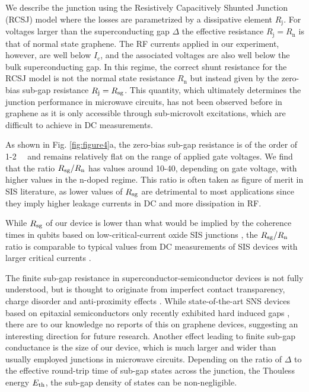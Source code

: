 We describe the junction using the Resistively Capacitively Shunted Junction (RCSJ) model where the losses are parametrized by a dissipative element $R_\textrm{j}$.
For voltages larger than the superconducting gap $\Delta$ the effective resistance $R_\textrm{j} = R_\textrm{n}$ is that of normal state graphene.
The RF currents applied in our experiment, however, are well below $I_\textrm{c}$, and the associated voltages are also well below the bulk superconducting gap.
In this regime, the correct shunt resistance for the RCSJ model is not the normal state resistance $R_\textrm{n}$ but instead given by the zero-bias sub-gap resistance $R_\textrm{j} = R_{\rm sg}$.
This quantity, which ultimately determines the junction performance in microwave circuits, has not been observed before in graphene as it is only accessible through sub-microvolt excitations, which are difficult to achieve in DC measurements.

As shown in Fig. \ref{fig:figure4}a, the zero-bias sub-gap resistance is of the order of 1-\SI{2}{\kilo\Omega} and remains relatively flat on the range of applied gate voltages.
We find that the ratio $R_{\rm sg}/R_\textrm{n}$ has values around 10-40, depending on gate voltage, with higher values in the n-doped regime.
This ratio is often taken as figure of merit in SIS literature, as lower values of $R_{\rm sg}$ are detrimental to most applications since they imply higher leakage currents in DC and more dissipation in RF.

While $R_{\rm sg}$ of our device is lower than what would be implied by the coherence times in qubits based on low-critical-current oxide SIS junctions \cite{paik_observation_2011a}, the $R_{\rm sg}/R_\textrm{n}$ ratio is comparable to typical values from DC measurements of SIS devices with larger critical currents \cite{iosad_characterization_2002a,tolpygo_subgap_2013}.

The finite sub-gap resistance in superconductor-semiconductor devices is not fully understood, but is thought to originate from imperfect contact transparency, charge disorder and anti-proximity effects \cite{liu_phenomenology_2017a,bretheau_tunnelling_2017a}.
While state-of-the-art SNS devices based on epitaxial semiconductors only recently exhibited hard induced gaps \cite{chang_hard_2015,kjaergaard_quantized_2016}, there are to our knowledge no reports of this on graphene devices, suggesting an interesting direction for future research.
Another effect leading to finite sub-gap conductance is the size of our device, which is much larger and wider than usually employed junctions in microwave circuits.
Depending on the ratio of $\Delta$ to the effective round-trip time of sub-gap states across the junction, the Thouless energy $E_{\rm th}$, the sub-gap density of states can be non-negligible.

